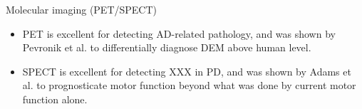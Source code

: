 \documentclass[10pt]{beamer}
\begin{document}
\begin{frame}[t]{Molecular imaging (PET/SPECT)}
{\begin{itemize}[itemsep=-0.3em]
\begin{itemize}
                    \item {\scriptsize PET is excellent for detecting AD-related pathology, and was shown by Pevronik et al. to differentially diagnose DEM above human level. }
                    \item {\scriptsize SPECT is excellent for detecting XXX in PD, and was shown by Adams et al. to prognosticate motor function beyond what was done by current motor function alone.}
                \end{itemize}
            \end{itemize}
        }
    \end{frame}

\end{document}
